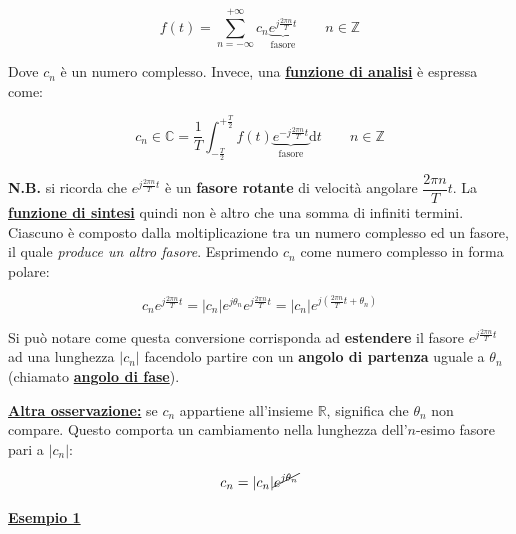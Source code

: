 \documentclass[a4paper]{article}
\begin{document}
	\begin{equation*}
		f(t) = \sum_{n = -\infty}^{+\infty} c_{n} \underbrace{e^{j \frac{2\pi n}{T}t}}_{\text{fasore}} \hspace{2em} n\in\mathbb{Z}
	\end{equation*}

	\noindent
	Dove $c_{n}$ è un numero complesso. Invece, una \textbf{\underline{funzione di analisi}} è espressa come:
	
	\begin{equation*}
		c_{n} \in \mathbb{C} = \dfrac{1}{T} \int_{-\frac{T}{2}}^{+\frac{T}{2}} f\left(t\right) \underbrace{e^{-j \frac{2\pi n}{T}t}}_{\text{fasore}} \mathrm{d}t \hspace{2em} n \in \mathbb{Z}
	\end{equation*}

	\noindent
	\textbf{N.B.} si ricorda che $e^{j \frac{2\pi n}{T}t}$ è un \textbf{fasore rotante} di velocità angolare $\dfrac{2\pi n}{T} t$.\newline
	La \textbf{\underline{funzione di sintesi}} quindi non è altro che una somma di infiniti termini. Ciascuno è composto dalla moltiplicazione tra un numero complesso ed un fasore, il quale \emph{produce un altro fasore}. Esprimendo $c_{n}$ come numero complesso in forma polare:
	
	\begin{equation*}
		c_{n} e^{j \frac{2 \pi n}{T} t} = |c_{n}| e^{j \theta_{n}} e^{j \frac{2 \pi n}{T} t} = |c_{n}| e^{j \left(\frac{2 \pi n}{T} t + \theta_{n}\right)}
	\end{equation*}

	\noindent
	Si può notare come questa conversione corrisponda ad \textbf{estendere} il fasore $e^{j\frac{2 \pi n}{T} t}$ ad una lunghezza $|c_{n}|$ facendolo partire con un \textbf{angolo di partenza} uguale a $\theta_{n}$ (chiamato \textbf{\underline{angolo di fase}}).\newline
	
	\noindent
	\textbf{\underline{Altra osservazione:}} se $c_{n}$ appartiene all'insieme $\mathbb{R}$, significa che $\theta_{n}$ non compare. Questo comporta un cambiamento nella lunghezza dell'$n$-esimo fasore pari a $|c_{n}|$:
	
	\begin{equation*}
		c_{n} = |c_{n}| \cancel{e^{j \theta_{n}}}
	\end{equation*}

	\newpage
	
	\noindent
	\textcolor{Green4}{\textbf{\underline{Esempio 1}}}\newline
	
\end{document}
